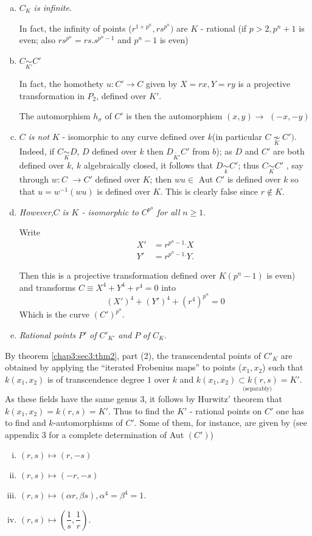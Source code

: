\begin{enumerate}[a)]
\item $C_K$ \textit{is infinite}.

  In fact, the infinity of points (${r^{1+p^{n}},rs^{p^n}})$ are $K$ -
  rational (if $p>2, {p^n +1}$ is even; also ${rs^{p^n}} =
  rs.{s^{p^n-1}}$ and ${p^n -1}$ is even) 
\item $C \underset{K'}{\sim} C'$

  In fact, the homothety $u : C' \rightarrow C$ given by $X = rx, Y =
  ry$ is a projective transformation in ${P}_2$, defined over $K'$. 

  The automorphism $h_{\sigma}$ of $C'$ is then the automorphism
  $(x,y) \rightarrow$ \break  $(-x,-y)$ 
\item $C$ \textit {is not} $K$ - isomorphic to any curve defined over
  $k$(in particular ${C \underset{K}{\nsim}C'})$. Indeed, if ${C
  \underset{K}{\sim} D}$, $D$ defined over $k$ then $D_{\tilde{K'}} C'$
  from $b$); as $D$ and $C'$ are both defined over $k$, $k$
  algebraically closed, it follows that ${D} \underset{k}{\sim} C'$;
  thus ${C}\underset{K}{\sim}C'$ , say through $ w : C $ $\rightarrow
  {C'}$ defined over $K$; then $w u \in $ Aut $C'$ is defined over $k$
  so that $u = {w^{-1}}({w} u)$ is defined over $K$. This is clearly
  false since $r \not\in K$. 
\item \textit{However},\pageoriginale $C$ \textit{is $K$ - isomorphic to}
  ${C^{p^n}}$ \textit{for all} $n \geq 1$. 
  
  Write
  \begin{align*}
    {X}' & = {r^{p^n -1.}X}\\
    {Y'} & = {r^{p^n -1.}Y.}
  \end{align*}

  Then this is a projective transformation defined over $K
  (p^n-1)$ is even) and transforms $C \equiv X^4 + Y^4 +
  r^4 = 0$ into  
  $$
  (X')^4 + (Y')^4 + (r^4)^{p^n} = 0
  $$
  Which is the curve $(C')^{p^n}$.
\item \textit{Rational points} $P'$ \textit{of} $C'_{K'}$ \textit{ and
} $P$ \textit{ of } $C_{K}$. 
\end{enumerate}

By theorem \ref{chap3:sec3:thm2}, part (2), the transcendental points of $C'_K$ are obtained
by applying the ``iterated Frobenius maps'' to points ($x_1,x_2$) such
that $k(x_1,x_2)$ is of transcendence degree $1$ over $k$ and
$k(x_1,x_2) \underset{\text{(separably)}}{\subset k(r,s)} = K'$. As these
fields have the same genus 3, it follows by Hurwitz$'$ theorem that
$k(x_1,x_2) = k(r,s) = K'$. Thus to find the $K'$ - rational points on
$C'$ one has to find and $k$-automorphisms of $C'$. Some of them, for
instance, are given by (see appendix 3 for a complete determination
of Aut $(C')$) 
\begin{enumerate}[i)]
\item $(r,s)  \mapsto (r, -s)$
\item $(r,s)  \mapsto (-r, -s)$
\item $(r,s)  \mapsto (\alpha r, \beta s), \alpha^4 = \beta^4 = 1$.
\item $(r,s)  \mapsto \left(\dfrac{1}{s},\dfrac{1}{r}\right)$.
\end{enumerate}

